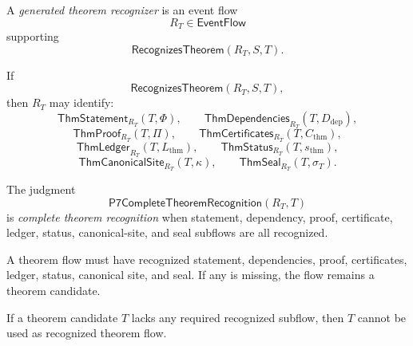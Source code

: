 \begin{definition}
\label{def:theorem-proof-generated-theorem-recognizer}
A \emph{generated theorem recognizer} is an event flow
$$
  R_T\in\mathsf{EventFlow}
$$
supporting
$$
  \mathsf{RecognizesTheorem}(R_T,S,T).
$$
\end{definition}

\begin{definition}
\label{def:theorem-proof-theorem-subflows}
If
$$
  \mathsf{RecognizesTheorem}(R_T,S,T),
$$
then $R_T$ may identify:
$$
  \mathsf{ThmStatement}_{R_T}(T,\Phi),
  \qquad
  \mathsf{ThmDependencies}_{R_T}(T,D_{\mathrm{dep}}),
$$
$$
  \mathsf{ThmProof}_{R_T}(T,\Pi),
  \qquad
  \mathsf{ThmCertificates}_{R_T}(T,C_{\mathrm{thm}}),
$$
$$
  \mathsf{ThmLedger}_{R_T}(T,L_{\mathrm{thm}}),
  \qquad
  \mathsf{ThmStatus}_{R_T}(T,s_{\mathrm{thm}}),
$$
$$
  \mathsf{ThmCanonicalSite}_{R_T}(T,\kappa),
  \qquad
  \mathsf{ThmSeal}_{R_T}(T,\sigma_T).
$$
\end{definition}

\begin{definition}
\label{def:theorem-proof-complete-theorem-recognition}
The judgment
$$
  \mathsf{P7CompleteTheoremRecognition}(R_T,T)
$$
is \emph{complete theorem recognition} when statement, dependency, proof, certificate, ledger, status, canonical-site, and seal subflows are all recognized.
\end{definition}

\begin{principle}
\label{prin:theorem-proof-no-theorem-without-eight}
A theorem flow must have recognized statement, dependencies, proof, certificates, ledger, status, canonical site, and seal. If any is missing, the flow remains a theorem candidate.
\end{principle}

\begin{theorem}
\label{thm:theorem-proof-incomplete-not-theorem}
If a theorem candidate $T$ lacks any required recognized subflow, then $T$ cannot be used as recognized theorem flow.
\end{theorem}

